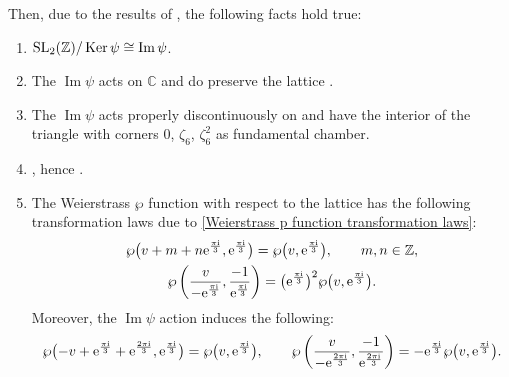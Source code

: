 Then, due to the results of \cite[Section 1 and 2]{M.Batchelor}, the following facts hold true:
\begin{enumerate}\itemsep=0pt
\item[(1)] ${\rm SL}_2(\mathbb{Z})/\operatorname{Ker}\psi\cong \operatorname{Im}\psi$.
\item[(2)] The $\operatorname{Im}\psi$ acts on $\mathbb{C}$ and do preserve the lattice .
\item[(3)] The $\operatorname{Im}\psi$ acts properly discontinuously on  and have the interior of the triangle with corners $0$, $\zeta_6$, $\zeta_6^2$ as fundamental chamber.
\item[(4)] , hence .
\item[(5)] The Weierstrass $\wp$ function with respect to the lattice  has the following transformation laws due to \eqref{Weierstrass p function transformation laws}:
 \begin{gather*}
\wp\bigl(v+m+n{\rm e}^{\frac{\pi {\rm i}}{3}},{\rm e}^{\frac{\pi {\rm i}}{3}}\bigr)=\wp\bigl(v,{\rm e}^{\frac{\pi {\rm i}}{3}}\bigr),\qquad m,n \in\mathbb{Z},\\
\wp\left(\frac{v}{-{\rm e}^{\frac{\pi {\rm i}}{3}}},\frac{-1}{{\rm e}^{\frac{\pi {\rm i}}{3}}}\right)=\bigl({\rm e}^{\frac{\pi {\rm i}}{3}}\bigr)^2\wp\bigl(v,{\rm e}^{\frac{\pi {\rm i}}{3}}\bigr).
\end{gather*}
Moreover, the $\operatorname{Im} \psi$ action induces the following:
 \begin{gather*}
\wp\bigl(-v+{\rm e}^{\frac{\pi {\rm i}}{3}}+{\rm e}^{\frac{2\pi {\rm i}}{3}},{\rm e}^{\frac{\pi {\rm i}}{3}}\bigr)=\wp\bigl(v,{\rm e}^{\frac{\pi {\rm i}}{3}}\bigr),\qquad
\wp\left(\frac{v}{-{\rm e}^{\frac{2\pi {\rm i}}{3}}},\frac{-1}{{\rm e}^{\frac{2\pi {\rm i}}{3}}}\right)=-{\rm e}^{\frac{\pi {\rm i}}{3}}\wp\bigl(v,{\rm e}^{\frac{\pi {\rm i}}{3}}\bigr).
\end{gather*}


\end{enumerate}

